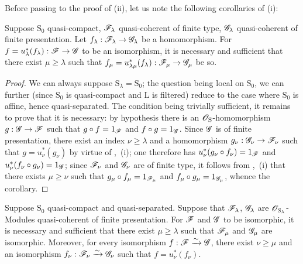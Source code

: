 Before passing to the proof of (ii), let us note the following corollaries of (i):

\begin{corollary}[8.5.2.4]
\label{IV.8.5.2.4}
Suppose $\mathrm{S}_0$ quasi-compact, $\mathscr{F}_\lambda$ quasi-coherent of finite type, $\mathscr{G}_\lambda$ quasi-coherent of finite presentation.
Let $f_\lambda:\mathscr{F}_\lambda\to\mathscr{G}_\lambda$ be a homomorphism.
For $f=u_\lambda^*(f_\lambda):\mathscr{F}\to\mathscr{G}$ to be an isomorphism, it is necessary and sufficient that there exist $\mu\geqslant\lambda$ such that $f_\mu=u_{\lambda\mu}^*(f_\lambda):\mathscr{F}_\mu\to\mathscr{G}_\mu$ be so.
\end{corollary}

\begin{proof}
We can always suppose $\mathrm{S}_\lambda=\mathrm{S}_0$; the question being local on $\mathrm{S}_0$, we can further (since $\mathrm{S}_0$ is quasi-compact and $\mathrm{L}$ is filtered) reduce to the case where $\mathrm{S}_0$ is affine, hence quasi-separated.
The condition being trivially sufficient, it remains to prove that it is necessary: by hypothesis there is an $\mathscr{O}_\mathrm{S}$-homomorphism $g:\mathscr{G}\to\mathscr{F}$ such that $g\circ f=1_{\mathscr{F}}$ and $f\circ g=1_{\mathscr{G}}$.
Since $\mathscr{G}$ is of finite presentation, there exist an index $\nu\geqslant\lambda$ and a homomorphism $g_\nu:\mathscr{G}_\nu\to\mathscr{F}_\nu$ such that $g=u_\nu^*(g_\nu)$ by virtue of ,~(i); one therefore has $u_\nu^*(g_\nu\circ f_\nu)=1_{\mathscr{F}}$
and $u_\nu^*(f_\nu\circ g_\nu)=1_{\mathscr{G}}$; since $\mathscr{F}_\nu$ and $\mathscr{G}_\nu$ are of finite type, it follows from ,~(i) that there exists $\mu\geqslant\nu$ such that $g_\mu\circ f_\mu=1_{\mathscr{F}_\mu}$ and $f_\mu\circ g_\mu=1_{\mathscr{G}_\mu}$, whence the corollary.
\end{proof}

\begin{corollary}[8.5.2.5]
\label{IV.8.5.2.5}
Suppose $\mathrm{S}_0$ quasi-compact and quasi-separated.
Suppose that $\mathscr{F}_\lambda$, $\mathscr{G}_\lambda$ are $\mathscr{O}_{\mathrm{S}_\lambda}$-Modules quasi-coherent of finite presentation.
For $\mathscr{F}$ and $\mathscr{G}$ to be isomorphic, it is necessary and sufficient that there exist $\mu\geqslant\lambda$ such that $\mathscr{F}_\mu$ and $\mathscr{G}_\mu$ are isomorphic.
Moreover, for every isomorphism $f:\mathscr{F}\xrightarrow{\sim}\mathscr{G}$, there exist $\nu\geqslant\mu$ and an isomorphism $f_\nu:\mathscr{F}_\nu\xrightarrow{\sim}\mathscr{G}_\nu$ such that $f=u_\nu^*(f_\nu)$.
\end{corollary}

